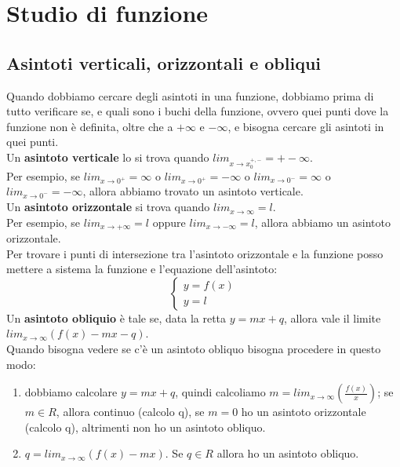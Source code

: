 \documentclass[11pt]{article}
\begin{document}
\section{Studio di funzione}
\subsection{Asintoti verticali, orizzontali e obliqui}
Quando dobbiamo cercare degli asintoti in una funzione, dobbiamo prima di tutto verificare se, e quali sono 
i buchi della funzione, ovvero quei punti dove la funzione non è definita, oltre che a $+\infty$ e $-\infty$, e bisogna cercare gli asintoti in quei punti.\\
Un \textbf{asintoto verticale} lo si trova quando $lim_{x \rightarrow x_{0}^{+,-}} = +- \infty$.\\
Per esempio, se $lim_{x \rightarrow 0^{+}} = \infty$ o $lim_{x \rightarrow 0^{+}} = -\infty$ o $lim_{x \rightarrow 0^{-}} = \infty$ o $lim_{x \rightarrow 0^{-}} = -\infty$, 
allora abbiamo trovato un asintoto verticale.\\
Un \textbf{asintoto orizzontale} si trova quando $lim_{x \rightarrow \infty} = l$.\\
Per esempio, se $lim_{x \rightarrow +\infty} = l$ oppure $lim_{x \rightarrow -\infty} = l$, allora abbiamo un asintoto orizzontale.\\
Per trovare i punti di intersezione tra l'asintoto orizzontale e la funzione posso mettere a sistema la funzione e l'equazione dell'asintoto:\\
$$
\begin{cases}
    y = f(x)\\
    y = l
\end{cases}
$$
Un \textbf{asintoto obliquio} è tale se, data la retta $y = mx + q$, allora vale il limite $lim_{x \rightarrow \infty}(f(x) - mx - q)$.\\
Quando bisogna vedere se c'è un asintoto obliquo bisogna procedere in questo modo:\\
\begin{enumerate}
    \item dobbiamo calcolare $y = mx + q$, quindi calcoliamo $m = lim_{x \rightarrow \infty}(\frac{f(x)}{x})$; se $m \in R$, allora continuo (calcolo q), se $m = 0$ ho un asintoto orizzontale (calcolo q), altrimenti non ho un asintoto obliquo.
    \item $q = lim_{x \rightarrow \infty}(f(x) - mx)$. Se $q \in R$ allora ho un asintoto obliquo.
\end{enumerate}
\end{document}
